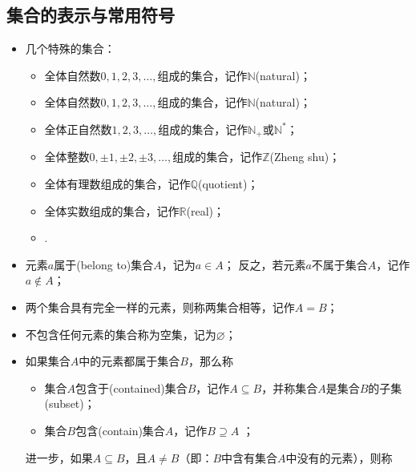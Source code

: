   \subsection{集合的表示与常用符号}
    \begin{itemize}
      \item 几个特殊的集合：
        \begin{itemize}
          \item 全体{\FDef 自然数}\;$0,1,2,3,\ldots ,$组成的集合，记作$\mathbb{N}$(natural)；
          \item 全体{\FDef 自然数}$0,1,2,3,\ldots ,$组成的集合，记作$\mathbb{N}$(natural)；
          \item 全体正自然数$1,2,3,\ldots ,$组成的集合，记作$\mathbb{N}_+$或$\mathbb{N}^*$；
          \item 全体{\FDef 整数}$0,\pm1,\pm2,\pm3,\ldots ,$组成的集合，记作$\mathbb{Z}$(Zheng shu)；
          \item 全体{\FDef 有理数}组成的集合，记作$\mathbb{Q}$(quotient)；
          \item 全体{\FDef 实数}组成的集合，记作$\mathbb{R}$(real)；
          \item {}.
        \end{itemize}
      \item 元素$a${\FDef 属于}(belong to)集合$A$，记为$a\in A$；
        反之，若元素$a${\FDef 不属于}集合$A$，记作$a\notin A$；
        \\
      \item 两个集合具有完全一样的元素，则称两集合{\FDef 相等}，记作$A=B$；
        \\
      \item 不包含任何元素的集合称为{\FDef 空集}，记为$\varnothing$；
        \\
      \item 如果集合$A$中的元素都属于集合$B$，那么称
        \begin{itemize}
          \item 集合$A${\FDef 包含于}(contained)集合$B$，记作$A\subseteq B$，并称集合$A$是集合$B$的{\FDef 子集}(subset)；
          \item 集合$B${\FDef 包含}(contain)集合$A$，记作$B\supseteq A$ ；
        \end{itemize}
        进一步，如果$A\subseteq B$，且$A\neq B$（即：$B$中含有集合$A$中没有的元素），则称

\end{itemize}

